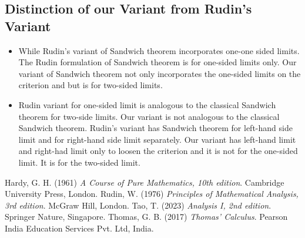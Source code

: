 \documentclass[a4paper,twoside,12pt]{article}
\theoremstyle{plain}
\theoremstyle{definition}
\begin{document}
\subsection{Distinction of our Variant from Rudin's Variant}
\begin{itemize}
\item While Rudin's variant of Sandwich theorem incorporates one-one sided limits. The Rudin formulation of Sandwich theorem is for one-sided limits only. Our variant of Sandwich theorem not only incorporates the one-sided limits on the criterion and but is for two-sided limits.

\item Rudin variant for one-sided limit is analogous to the classical Sandwich theorem for two-side limits. Our variant is not analogous to the classical Sandwich theorem. Rudin's variant has Sandwich theorem for left-hand side limit and for right-hand side limit separately. Our variant has left-hand limit and right-had limit only to loosen the criterion and it is not for the one-sided limit. It is for the two-sided limit.
  \end{itemize}
\vspace{5mm}

\begin{thebibliography}{9}
  Hardy, G. H. (1961) \emph{A Course of Pure Mathematics, 10th edition}. Cambridge University Press, London.
  Rudin, W. (1976) \emph{Principles of Mathematical Analysis, 3rd edition}. McGraw Hill, London.
  Tao, T. (2023) \emph{Analysis I, 2nd edition}. Springer Nature, Singapore.
  Thomas, G. B. (2017) \emph{Thomas' Calculus}. Pearson India Education Services Pvt. Ltd, India.
\end{thebibliography}
\end{document}
